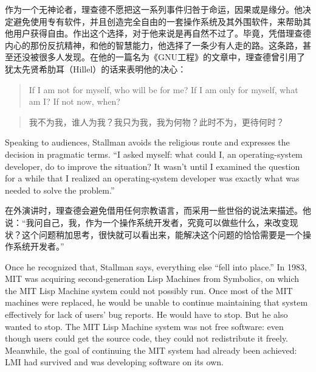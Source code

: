 \ifdefined\chs
作为一个无神论者，理查德不愿把这一系列事件归咎于命运，因果或是缘分。他决定避免使用专有软件，并且创造完全自由的一套操作系统及其外围软件，来帮助其他用户获得自由。作出这个选择，对于他来说是再自然不过了。毕竟，凭借理查德内心的那份反抗精神，和他的智慧能力，他选择了一条少有人走的路。这条路，甚至还没被很多人发现。在他的一篇名为《GNU工程》的文章中，理查德曾引用了犹太先贤希肋耳（Hillel）的话来表明他的决心：
\fi

\ifdefined\eng
\begin{quote}
If I am not for myself, who will be for me? If I am only for myself, what am I? If not now, when?
\end{quote}
\fi

\ifdefined\chs
\begin{quote}
我不为我，谁人为我？我只为我，我为何物？此时不为，更待何时？
\end{quote}
\fi

\ifdefined\eng
Speaking to audiences, Stallman avoids the religious route and expresses the decision in pragmatic terms. ``I asked myself: what could I, an operating-system developer, do to improve the situation? It wasn't until I examined the question for a while that I realized an operating-system developer was exactly what was needed to solve the problem.''
\fi

\ifdefined\chs
在外演讲时，理查德会避免借用任何宗教语言，而采用一些世俗的说法来描述。他说：``我问自己，我，作为一个操作系统开发者，究竟可以做些什么，来改变现状？这个问题稍加思考，很快就可以看出来，能解决这个问题的恰恰需要是一个操作系统开发者。''
\fi

\ifdefined\eng
Once he recognized that, Stallman says, everything else ``fell into place.'' In 1983, MIT was acquiring second-generation Lisp Machines from Symbolics, on which the MIT Lisp Machine system could not possibly run.  Once most of the MIT machines were replaced, he would be unable to continue maintaining that system effectively for lack of users' bug reports.  He would have to stop.  But he also wanted to stop.  The MIT Lisp Machine system was not free software: even though users could get the source code, they could not redistribute it freely.  Meanwhile, the goal of continuing the MIT system had already been achieved: LMI had survived and was developing software on its own.
\fi

